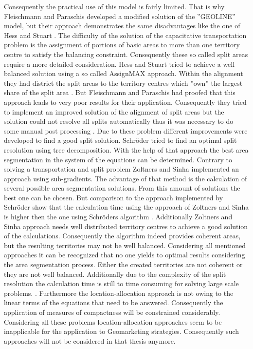 Consequently the practical use of this model is fairly limited. That is why Fleischmann and Paraschis \cite{fleischmann} developed a modified solution of the ''GEOLINE'' model, but their approach demonstrates the same disadvantages like the one of Hess and Stuart \cite{hessstuart}. The difficulty of the solution of the capacitative transportation problem is the assignment of portions of basic areas to more than one territory centre to satisfy the balancing constraint. Consequently these so called split areas require a more detailed consideration. Hess and Stuart \cite{hessstuart} tried to achieve a well balanced solution using a so called AssignMAX approach. Within the alignment they had district the split areas to the territory centres which ''own'' the largest share of the split area \cite{hessstuart, kalcsics}. But Fleischmann and Paraschis \cite{fleischmann} had proofed that this approach leads to very poor results for their application. Consequently they tried to implement an improved solution of the alignment of split areas but the solution could not resolve all splits automatically thus it was necessary to do some manual post processing \cite{fleischmann, kalcsics}. Due to these problem different improvements were developed to find a good split solution. Schröder \cite{schroeder} tried to find an optimal split resolution using tree decomposition. With the help of that approach the best area segmentation in the system of the equations can be determined. Contrary to solving a transportation and split problem Zoltners and Sinha \cite{zoltner} implemented an approach using sub-gradients. The advantage of that method is the calculation of several possible area segmentation solutions. From this amount of solutions the best one can be chosen. But comparison to the approach implemented by Schröder \cite{schroeder} show that the calculation time using the approach of Zoltners and Sinha \cite{zoltner} is higher then the one using Schröders algorithm \cite{schroeder}. Additionally Zoltners and Sinha \cite{zoltner} approach needs well distributed territory centres to achieve a good solution of the calculations. Consequently the algorithm indeed provides coherent areas, but the resulting territories may not be well balanced. Considering all mentioned approaches it can be recognized that no one yields to optimal results considering the area segmentation process. Either the created territories are not coherent or they are not well balanced. Additionally due to the complexity of the split resolution the calculation time is still to time consuming for solving large scale problems. \cite{kalcsics}. Furthermore the location-allocation approach is not owing to the linear terms of the equations that need to be answered. Consequently the application of measures of compactness will be constrained considerably. Considering all these problems location-allocation approaches seem to be inapplicable for the application to Geomarketing strategies. Consequently such approaches will not be considered in that thesis anymore. \\
